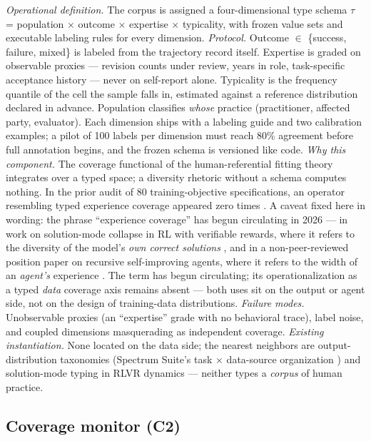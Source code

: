 \documentclass[10pt]{article}
\begin{document}
\emph{Operational definition.} The corpus is assigned a four-dimensional type schema $\tau$ = population $\times$ outcome $\times$ expertise $\times$ typicality, with frozen value sets and executable labeling rules for every dimension. \emph{Protocol.} Outcome $\in$ \{success, failure, mixed\} is labeled from the trajectory record itself. Expertise is graded on observable proxies --- revision counts under review, years in role, task-specific acceptance history --- never on self-report alone. Typicality is the frequency quantile of the cell the sample falls in, estimated against a reference distribution declared in advance. Population classifies \emph{whose} practice (practitioner, affected party, evaluator). Each dimension ships with a labeling guide and two calibration examples; a pilot of 100 labels per dimension must reach 80\% agreement before full annotation begins, and the frozen schema is versioned like code. \emph{Why this component.} The coverage functional of the human-referential fitting theory integrates over a typed space; a diversity rhetoric without a schema computes nothing. In the prior audit of 80 training-objective specifications, an operator resembling typed experience coverage appeared zero times \cite{ref5}. A caveat fixed here in wording: the phrase ``experience coverage'' has begun circulating in 2026 --- in work on solution-mode collapse in RL with verifiable rewards, where it refers to the diversity of the model's \emph{own correct solutions} \cite{ref11}, and in a non-peer-reviewed position paper on recursive self-improving agents, where it refers to the width of an \emph{agent's} experience \cite{ref12}. The term has begun circulating; its operationalization as a typed \emph{data} coverage axis remains absent --- both uses sit on the output or agent side, not on the design of training-data distributions. \emph{Failure modes.} Unobservable proxies (an ``expertise'' grade with no behavioral trace), label noise, and coupled dimensions masquerading as independent coverage. \emph{Existing instantiation.} None located on the data side; the nearest neighbors are output-distribution taxonomies (Spectrum Suite's task $\times$ data-source organization \cite{ref7}) and solution-mode typing in RLVR dynamics \cite{ref11} --- neither types a \emph{corpus} of human practice.

\subsection{Coverage monitor (C2)}
\end{document}

